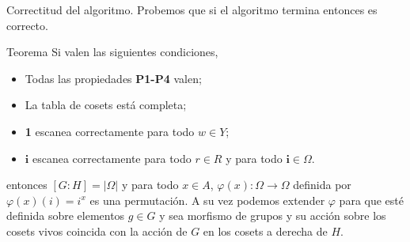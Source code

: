 \documentclass[aspectratio=169, 9pt]{beamer}
\begin{document}
\begin{frame}[fragile]{Correctitud del algoritmo.}
Probemos que si el algoritmo termina entonces es correcto.
\pause
\begin{alertblock}{Teorema}
	Si valen las siguientes condiciones,
	\begin{itemize}
		\item Todas las propiedades \textbf{P1-P4} valen;
		\item La tabla de cosets está completa;
		\item \textbf{1} escanea correctamente para todo $w \in Y$;
		\item $\textbf{i}$ escanea correctamente para todo $r \in R$ y para todo $\textbf{i} \in \Omega$.
	\end{itemize}
	entonces $[G:H] = |\Omega|$ y para todo $x \in A$, $\varphi(x): \Omega \to \Omega$ definida por $\varphi(x)(i) = i^x$ es una permutación.
	A su vez podemos extender $\varphi$ para que esté definida sobre elementos $g \in G$ y sea morfismo de grupos y su acción sobre los cosets vivos coincida con la acción de $G$ en los cosets a derecha de $H$.
\end{alertblock}
\pause
\medskip
\end{frame}
\end{document}
